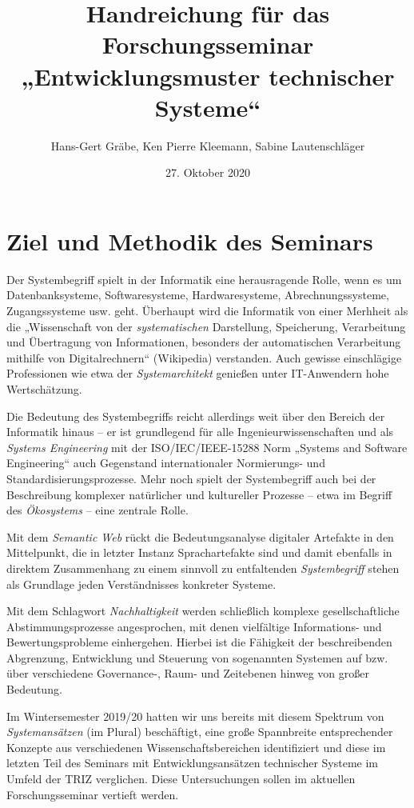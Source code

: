 \documentclass[11pt,a4paper]{article}
\title{Handreichung für das Forschungsseminar\\ „Entwicklungsmuster
  technischer Systeme“}
\author{Hans-Gert Gr\"abe, Ken Pierre Kleemann, Sabine Lautenschläger}
\date{27. Oktober 2020}
\begin{document}
\maketitle

\section{Ziel und Methodik des Seminars}

Der Systembegriff spielt in der Informatik eine herausragende Rolle, wenn es
um Datenbanksysteme, Softwaresysteme, Hardwaresysteme, Abrechnungssysteme,
Zugangssysteme usw. geht.  Überhaupt wird die Informatik von einer Merhheit
als die „Wissenschaft von der \emph{systematischen} Darstellung, Speicherung,
Verarbeitung und Übertragung von Informationen, besonders der automatischen
Verarbeitung mithilfe von Digitalrechnern“ (Wikipedia) verstanden.  Auch
gewisse einschlägige Professionen wie etwa der \emph{Systemarchitekt} genießen
unter IT-Anwendern hohe Wertschätzung.

Die Bedeutung des Systembegriffs reicht allerdings weit über den Bereich der
Informatik hinaus -- er ist grundlegend für alle Ingenieurwissenschaften und
als \emph{Systems Engineering} mit der ISO/IEC/IEEE-15288 Norm „Systems and
Software Engineering“ auch Gegenstand internationaler Normierungs- und
Standardisierungsprozesse.  Mehr noch spielt der Systembegriff auch bei der
Beschreibung komplexer natürlicher und kultureller Prozesse -- etwa im Begriff
des \emph{Ökosystems} -- eine zentrale Rolle.

Mit dem \emph{Semantic Web} rückt die Bedeutungsanalyse digitaler Artefakte in
den Mittelpunkt, die in letzter Instanz Sprachartefakte sind und damit
ebenfalls in direktem Zusammenhang zu einem sinnvoll zu entfaltenden
\emph{Systembegriff} stehen als Grundlage jeden Verständnisses konkreter
Systeme.

Mit dem Schlagwort \emph{Nachhaltigkeit} werden schließlich komplexe
gesellschaftliche Abstimmungsprozesse angesprochen, mit denen vielfältige
Informations- und Bewertungsprobleme einhergehen. Hierbei ist die Fähigkeit
der beschreibenden Abgrenzung, Entwicklung und Steuerung von sogenannten
Systemen auf bzw. über verschiedene Governance-, Raum- und Zeitebenen hinweg
von großer Bedeutung.

Im Wintersemester 2019/20 hatten wir uns bereits mit diesem Spektrum von
\emph{Systemansätzen} (im Plural) beschäftigt, eine große Spannbreite
entsprechender Konzepte aus verschiedenen Wissenschaftsbereichen identifiziert
und diese im letzten Teil des Seminars mit Entwicklungsansätzen technischer
Systeme im Umfeld der TRIZ verglichen.  Diese Untersuchungen sollen im
aktuellen Forschungsseminar vertieft werden.
\newpage
\end{document}
